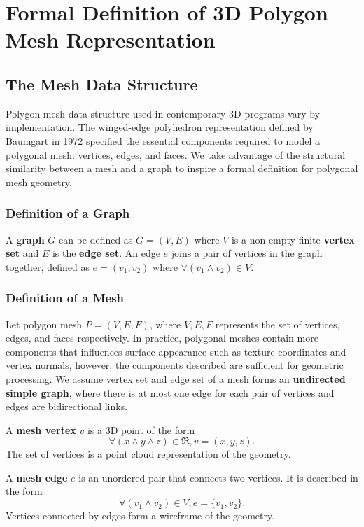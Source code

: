 \documentclass[ %
author={Dillon Keith Diep},
supervisor={Dr. Carl Henrik Ek},
degree={MEng},
title={ART-CG:},
subtitle={Assisted Real-time Content Generation of 3D Hair by Learning Manifolds},
type={Research},
year={2017} ]{dissertation}
\begin{document}
\section{Formal Definition of 3D Polygon Mesh Representation}

\subsection{The Mesh Data Structure}
Polygon mesh data structure used in contemporary 3D programs vary by implementation. The winged-edge polyhedron representation defined by Baumgart in 1972 \cite{wingededge} specified the essential components required to model a polygonal mesh: vertices, edges, and faces. We take advantage of the structural similarity between a mesh and a graph to inspire a formal definition for polygonal mesh geometry.

\subsubsection{Definition of a Graph}
A \textbf{graph} $G$ can be defined as $G=(V,E)$ where $V$ is a non-empty finite \textbf{vertex set} and $E$ is the \textbf{edge set}\cite[p.8]{graphtheory}. An edge $e$ joins a pair of vertices in the graph together, defined as $e=(v_1, v_2)$ where $\forall(v_1 \land v_2)\in V$.

\subsubsection{Definition of a Mesh}
Let polygon mesh $P = (V, E, F)$, where $V, E, F$ represents the set of vertices, edges, and faces respectively. In practice, polygonal meshes contain more components that influences surface appearance such as texture coordinates and vertex normals, however, the components described are sufficient for geometric processing. We assume vertex set and edge set of a mesh forms an \textbf{undirected simple graph}, where there is at most one edge for each pair of vertices and edges are bidirectional links.

A \textbf{mesh vertex} $v$ is a 3D point of the form
$$\forall (x \land y \land z) \in \Re, v = (x, y, z).$$
The set of vertices is a point cloud representation of the geometry. 

A \textbf{mesh edge} $e$ is an unordered pair that connects two vertices. It is described in the form
$$\forall (v_1 \land v_2) \in V, e = \{v_1, v_2\}.$$
Vertices connected by edges form a wireframe of the geometry. 
\end{document}
